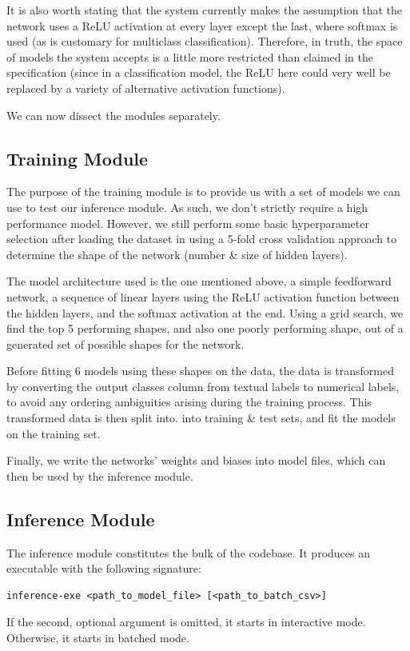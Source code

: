 \documentclass[12pt]{article}
\begin{document}
It is also worth stating that the system currently makes the assumption that the network uses a ReLU activation at every layer except the last, where softmax is used (as is customary for multiclass classification). Therefore, in truth, the space of models the system accepts is a little more restricted than claimed in the specification (since in a classification model, the ReLU here could very well be replaced by a variety of alternative activation functions).\bigskip

We can now dissect the modules separately.

\subsection{Training Module}
The purpose of the training module is to provide us with a set of models we can use to test our inference module. As such, we don't strictly require a high performance model. However, we still perform some basic hyperparameter selection after loading the dataset in using a 5-fold cross validation approach to determine the shape of the network (number \& size of hidden layers).\bigskip

The model architecture used is the one mentioned above, a simple feedforward network, a sequence of linear layers using the ReLU activation function between the hidden layers, and the softmax activation at the end. Using a grid search, we find the top 5 performing shapes, and also one poorly performing shape, out of a generated set of possible shapes for the network.\bigskip

Before fitting 6 models using these shapes on the data, the data is transformed by converting the output classes column from textual labels to numerical labels, to avoid any ordering ambiguities arising during the training process. This transformed data is then split into. into training \& test sets, and fit the models on the training set.\bigskip

Finally, we write the networks' weights and biases into model files, which can then be used by the inference module.

\subsection{Inference Module}
The inference module constitutes the bulk of the codebase. It produces an executable with the following signature:
\begin{verbatim}
inference-exe <path_to_model_file> [<path_to_batch_csv>]
\end{verbatim}
If the second, optional argument is omitted, it starts in interactive mode. Otherwise, it starts in batched mode.\bigskip
\end{document}
